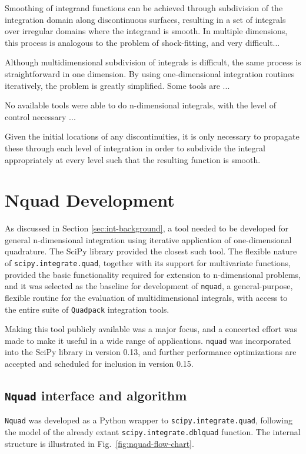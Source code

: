 Smoothing of integrand functions can be achieved through subdivision of the integration domain along discontinuous surfaces, resulting in a set of integrals over irregular domains where the integrand is smooth. In multiple dimensions, this process is analogous to the problem of shock-fitting, and very difficult...

Although multidimensional subdivision of integrals is difficult, the same process is straightforward in one dimension. By using one-dimensional integration routines iteratively, the problem is greatly simplified. Some tools are ... 

No available tools were able to do n-dimensional integrals, with the level of control necessary ...

Given the initial locations of any discontinuities, it is only necessary to propagate these through each level of integration in order to subdivide the integral appropriately at every level such that the resulting function is smooth.

\section{Nquad Development}
\label{sec:int-nquad}

As discussed in Section \ref{sec:int-background}, a tool needed to be developed for general n-dimensional integration using iterative application of one-dimensional quadrature. The SciPy library\cite{Oliphant2007} provided the closest such tool. The flexible nature of {\tt scipy.integrate.quad}, together with its support for multivariate functions, provided the basic functionality required for extension to n-dimensional problems, and it was selected as the baseline for development of {\tt nquad}, a general-purpose, flexible routine for the evaluation of multidimensional integrals, with access to the entire suite of {\tt Quadpack} integration tools.

Making this tool publicly available was a major focus, and a concerted effort was made to make it useful in a wide range of applications. {\tt nquad} was incorporated into the SciPy library in version 0.13, and further performance optimizations are accepted and scheduled for inclusion in version 0.15. 

\subsection{{\tt Nquad} interface and algorithm}

{\tt Nquad} was developed as a Python wrapper to {\tt scipy.integrate.quad}, following the model of the already extant {\tt scipy.integrate.dblquad} function. The internal structure is illustrated in Fig.~\ref{fig:nquad-flow-chart}. 

